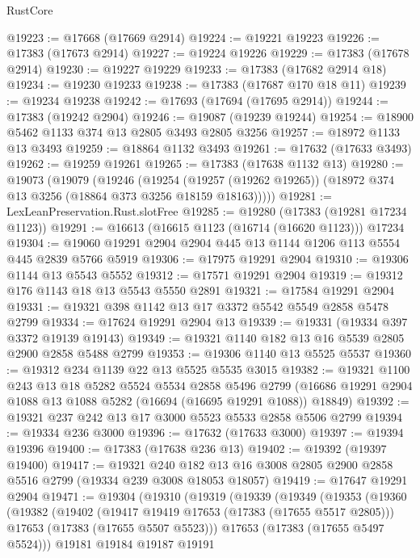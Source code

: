 \begin{lexlean}{RustCore}
\begin{coremodule}
@19223 := @17668 (@17669 @2914)
@19224 := @19221 @19223
@19226 := @17383 (@17673 @2914)
@19227 := @19224 @19226
@19229 := @17383 (@17678 @2914)
@19230 := @19227 @19229
@19233 := @17383 (@17682 @2914 @18)
@19234 := @19230 @19233
@19238 := @17383 (@17687 @170 @18 @11)
@19239 := @19234 @19238
@19242 := @17693 (@17694 (@17695 @2914))
@19244 := @17383 (@19242 @2904)
@19246 := @19087 (@19239 @19244)
@19254 := @18900 @5462 @1133 @374 @13 @2805 @3493 @2805 @3256
@19257 := @18972 @1133 @13 @3493
@19259 := @18864 @1132 @3493
@19261 := @17632 (@17633 @3493)
@19262 := @19259 @19261
@19265 := @17383 (@17638 @1132 @13)
@19280 := @19073
    (@19079
      (@19246
        (@19254
          (@19257 (@19262 @19265))
          (@18972 @374 @13 @3256 (@18864 @373 @3256 @18159 @18163)))))
@19281 := LexLeanPreservation.Rust.slotFree
@19285 := @19280 (@17383 (@19281 @17234 @1123))
@19291 := @16613 (@16615 @1123 (@16714 (@16620 @1123))) @17234
@19304 := @19060 @19291 @2904 @2904 @445 @13 @1144 @1206 @113 @5554 @445 @2839 @5766 @5919
@19306 := @17975 @19291 @2904
@19310 := @19306 @1144 @13 @5543 @5552
@19312 := @17571 @19291 @2904
@19319 := @19312 @176 @1143 @18 @13 @5543 @5550 @2891
@19321 := @17584 @19291 @2904
@19331 := @19321 @398 @1142 @13 @17 @3372 @5542 @5549 @2858 @5478 @2799
@19334 := @17624 @19291 @2904 @13
@19339 := @19331 (@19334 @397 @3372 @19139 @19143)
@19349 := @19321 @1140 @182 @13 @16 @5539 @2805 @2900 @2858 @5488 @2799
@19353 := @19306 @1140 @13 @5525 @5537
@19360 := @19312 @234 @1139 @22 @13 @5525 @5535 @3015
@19382 := @19321
    @1100
    @243
    @13
    @18
    @5282
    @5524
    @5534
    @2858
    @5496
    @2799
    (@16686 @19291 @2904 @1088 @13 @1088 @5282 (@16694 (@16695 @19291 @1088)) @18849)
@19392 := @19321 @237 @242 @13 @17 @3000 @5523 @5533 @2858 @5506 @2799
@19394 := @19334 @236 @3000
@19396 := @17632 (@17633 @3000)
@19397 := @19394 @19396
@19400 := @17383 (@17638 @236 @13)
@19402 := @19392 (@19397 @19400)
@19417 := @19321
    @240
    @182
    @13
    @16
    @3008
    @2805
    @2900
    @2858
    @5516
    @2799
    (@19334 @239 @3008 @18053 @18057)
@19419 := @17647 @19291 @2904
@19471 := @19304
    (@19310
      (@19319
        (@19339
          (@19349
            (@19353
              (@19360
                (@19382
                  (@19402
                    (@19417 @19419 @17653 (@17383 (@17655 @5517 @2805)))
                    @17653
                    (@17383 (@17655 @5507 @5523)))
                  @17653
                  (@17383 (@17655 @5497 @5524)))
                @19181
                @19184
                @19187
                @19191

\end{coremodule}
\end{lexlean}
